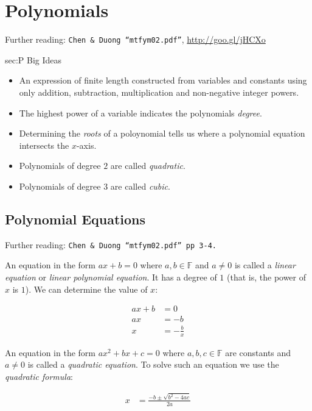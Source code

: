 \chapter{Polynomials}
\label{chap:P}
Further reading: \texttt{Chen \& Duong ``mtfym02.pdf''}, \url{http://goo.gl/jHCXo}

\begin{bigideas}{sec:P Big Ideas}
\begin{itemize}
  \item An expression of finite length constructed from variables and constants
        using only addition, subtraction, multiplication and non-negative integer
        powers.
  \item The highest power of a variable indicates the polynomials \emph{degree}.
  \item Determining the \emph{roots} of a poloynomial tells us where a
        polynomial equation intersects the $x$-axis.
  \item Polynomials of degree $2$ are called \emph{quadratic}.
  \item Polynomials of degree $3$ are called \emph{cubic}.
\end{itemize}
\end{bigideas}

\section{Polynomial Equations}
\label{sec:P Polynomial Equations}
Further reading: \texttt{Chen \& Duong ``mtfym02.pdf'' pp 3-4.}

An equation in the form $ax + b = 0$ where $a,b \in \mathbb{F}$ and $a \neq 0$
is called a \emph{linear equation} or \emph{linear polynomial equation}. It has
a degree of $1$ (that is, the power of $x$ is $1$). We can determine the value
of $x$:

\begin{align}
  ax + b &= 0 \\
  ax &= -b \\
  x &= -\frac{b}{x}
\end{align}

An equation in the form $ax^2 + bx +c = 0$ where $a, b, c \in \mathbb{F}$ are
constants and $a \neq 0$ is called a \emph{quadratic equation}. To solve such an
equation we use the \emph{quadratic formula}:

\begin{align}
  x &= \frac{-b \pm \sqrt{b^2 -4ac}}{2a} \label{eq:quadraticFormula}
\end{align}


